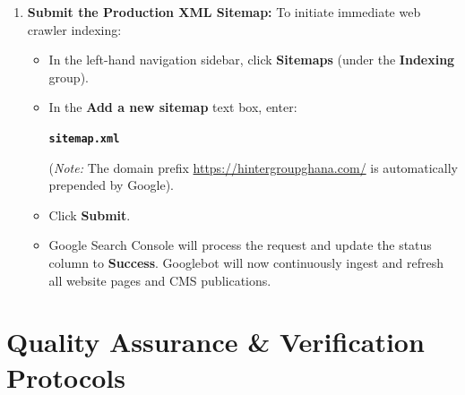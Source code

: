 \documentclass[11pt,a4paper,oneside]{book}
\begin{document}
\begin{enumerate}[leftmargin=*,label=\textbf{Step \arabic*:}]
  \item \textbf{Submit the Production XML Sitemap:}
    To initiate immediate web crawler indexing:
    \begin{itemize}[leftmargin=1.2cm]
      \item In the left-hand navigation sidebar, click \textbf{Sitemaps} (under the \textbf{Indexing} group).
      \item In the \textbf{Add a new sitemap} text box, enter:
        \begin{center}
          \Large\bfseries\texttt{sitemap.xml}
        \end{center}
        (\textit{Note:} The domain prefix \url{https://hintergroupghana.com/} is automatically prepended by Google).
      \item Click \textbf{Submit}.
      \item Google Search Console will process the request and update the status column to \textbf{Success}. Googlebot will now continuously ingest and refresh all website pages and CMS publications.
    \end{itemize}
\end{enumerate}

\chapter{Quality Assurance \& Verification Protocols}
\label{chap:qa}
\end{document}
